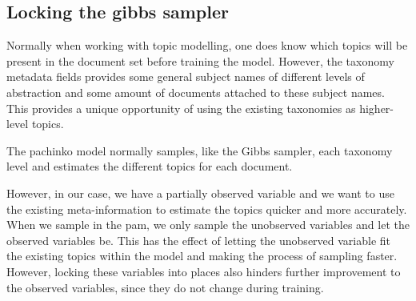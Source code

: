 \subsection{Locking the gibbs sampler}\label{sec:appendix/locking}
Normally when working with topic modelling, one does know which topics will be present in the document set before training the model.
However, the taxonomy metadata fields provides some general subject names of different levels of abstraction and some amount of documents attached to these subject names.
This provides a unique opportunity of using the existing taxonomies as higher-level topics.

The pachinko model normally samples, like the Gibbs sampler, each taxonomy level and estimates the different topics for each document.

However, in our case, we have a partially observed variable and we want to use the existing meta-information to estimate the topics quicker and more accurately.
When we sample in the \gls{pam}, we only sample the unobserved variables and let the observed variables be. 
This has the effect of letting the unobserved variable fit the existing topics within the model and making the process of sampling faster.
However, locking these variables into places also hinders further improvement to the observed variables, since they do not change during training.   
